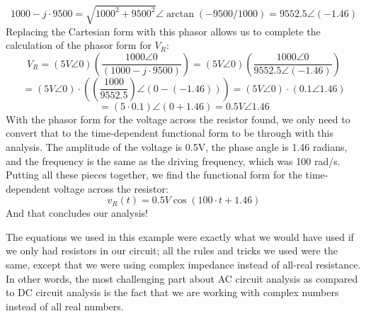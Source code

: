 $$
1000 - j\cdot9500 = \sqrt{1000^2+9500^2}\angle\arctan(-9500/1000) = 9552.5\angle(-1.46)
$$
Replacing the Cartesian form with this phasor allows us to complete the calculation of the phasor form for $V_R$:
$$
V_R = (5V\angle0)\left(\frac{1000\angle0}{(1000 - j\cdot9500)}\right) = (5V\angle0)\left(\frac{1000\angle0}{9552.5\angle(-1.46)}\right)
$$
$$
= (5V\angle0)\cdot\left(\left(\frac{1000}{9552.5}\right)\angle\left(0- \left(-1.46\right)\right)\right)=(5V\angle0)\cdot(0.1\angle1.46)
$$
$$
=(5\cdot0.1)\angle(0+1.46)=0.5V\angle1.46
$$
With the phasor form for the voltage across the resistor found, we only need to convert that to the time-dependent functional form to be through with this analysis. The amplitude of the voltage is 0.5V, the phase angle is 1.46 radians, and the frequency is the same as the driving frequency, which was 100 rad/s. Putting all these pieces together, we find the functional form for the time-dependent voltage across the resistor: 
$$
v_R(t)= 0.5V\cos(100\cdot t + 1.46)
$$
And that concludes our analysis!
\par
The equations we used in this example were exactly what we would have used if we only had resistors in our circuit; all the rules and tricks we used were the same, except that we were using complex impedance instead of all-real resistance. In other words, the most challenging part about AC circuit analysis as compared to DC circuit analysis is the fact that we are working with complex numbers instead of all real numbers. 
